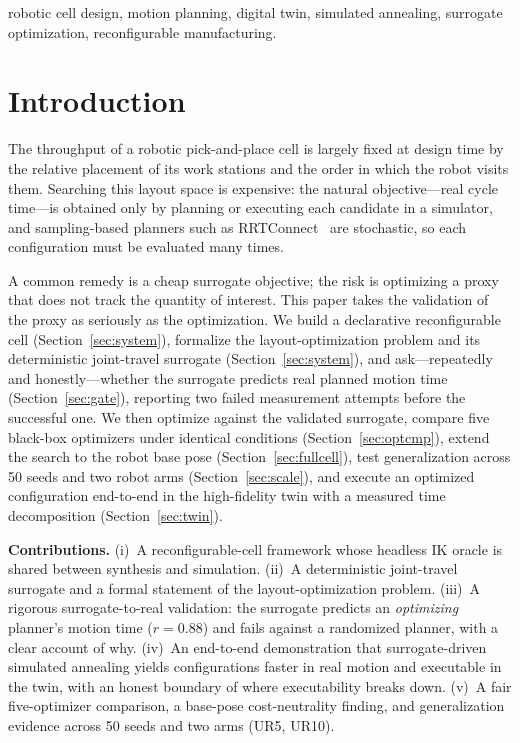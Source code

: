 \documentclass[conference]{IEEEtran}
\begin{document}
\begin{IEEEkeywords}
robotic cell design, motion planning, digital twin, simulated annealing, surrogate
optimization, reconfigurable manufacturing.
\end{IEEEkeywords}

\section{Introduction}
The throughput of a robotic pick-and-place cell is largely fixed at design time by the relative
placement of its work stations and the order in which the robot visits them. Searching this
layout space is expensive: the natural objective---real cycle time---is obtained only by
planning or executing each candidate in a simulator, and sampling-based planners such as
RRTConnect~\cite{rrtconnect} are stochastic, so each configuration must be evaluated many times.

A common remedy is a cheap surrogate objective; the risk is optimizing a proxy that does not
track the quantity of interest. This paper takes the validation of the proxy as seriously as the
optimization. We build a declarative reconfigurable cell (Section~\ref{sec:system}), formalize
the layout-optimization problem and its deterministic joint-travel surrogate
(Section~\ref{sec:system}), and ask---repeatedly and honestly---whether the surrogate predicts
real planned motion time (Section~\ref{sec:gate}), reporting two failed measurement attempts
before the successful one. We then optimize against the validated surrogate, compare five
black-box optimizers under identical conditions (Section~\ref{sec:optcmp}), extend the search to
the robot base pose (Section~\ref{sec:fullcell}), test generalization across 50 seeds and two
robot arms (Section~\ref{sec:scale}), and execute an optimized configuration end-to-end in the
high-fidelity twin with a measured time decomposition (Section~\ref{sec:twin}).

\textbf{Contributions.} (i)~A reconfigurable-cell framework whose headless IK oracle is shared
between synthesis and simulation. (ii)~A deterministic joint-travel surrogate and a formal
statement of the layout-optimization problem. (iii)~A rigorous surrogate-to-real validation:
the surrogate predicts an \emph{optimizing} planner's motion time ($r=0.88$) and fails against a
randomized planner, with a clear account of why. (iv)~An end-to-end demonstration that
surrogate-driven simulated annealing yields configurations faster in real motion and executable
in the twin, with an honest boundary of where executability breaks down. (v)~A fair
five-optimizer comparison, a base-pose cost-neutrality finding, and generalization evidence
across 50 seeds and two arms (UR5, UR10).
\end{document}
